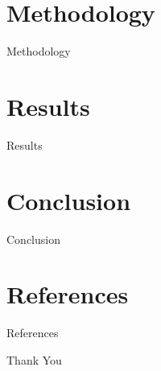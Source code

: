 \documentclass{beamer}
\theoremstyle{remark}
\theoremstyle{plain}
\theoremstyle{plain}
\begin{document}
\section{Methodology}
\begin{frame}{Methodology}
\end{frame}

\section{Results}
\begin{frame}{Results}
\end{frame}

\section{Conclusion}
\begin{frame}{Conclusion}
\end{frame}

\section{References}
\begin{frame}{References}
\end{frame}

\begin{frame}{Thank You}
\end{frame}
\end{document}
